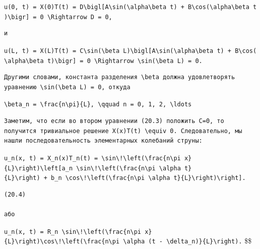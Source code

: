 \documentclass[
  ukrainian,
]{article}
\begin{document}
\texttt{u(0,\ t)\ =\ X(0)T(t)\ =\ D\textbackslash{}bigl{[}A\textbackslash{}sin(\textbackslash{}alpha\textbackslash{}beta\ t)\ +\ B\textbackslash{}cos(\textbackslash{}alpha\textbackslash{}beta\ t)\textbackslash{}bigr{]}\ =\ 0\ \textbackslash{}Rightarrow\ D\ =\ 0,}

\begin{verbatim}
и
\end{verbatim}

\texttt{u(L,\ t)\ =\ X(L)T(t)\ =\ C\textbackslash{}sin(\textbackslash{}beta\ L)\textbackslash{}bigl{[}A\textbackslash{}sin(\textbackslash{}alpha\textbackslash{}beta\ t)\ +\ B\textbackslash{}cos(\textbackslash{}alpha\textbackslash{}beta\ t)\textbackslash{}bigr{]}\ =\ 0\ \textbackslash{}Rightarrow\ \textbackslash{}sin(\textbackslash{}beta\ L)\ =\ 0.}

\begin{verbatim}
Другими словами, константа разделения \beta должна удовлетворять уравнению \sin(\beta L) = 0, откуда
\end{verbatim}

\texttt{\textbackslash{}beta\_n\ =\ \textbackslash{}frac\{n\textbackslash{}pi\}\{L\},\ \textbackslash{}qquad\ n\ =\ 0,\ 1,\ 2,\ \textbackslash{}ldots}

\begin{verbatim}
Заметим, что если во втором уравнении (20.3) положить C=0, то получится тривиальное решение X(x)T(t) \equiv 0. Следовательно, мы нашли последовательность элементарных колебаний струны:
\end{verbatim}

\texttt{u\_n(x,\ t)\ =\ X\_n(x)T\_n(t)\ =\ \textbackslash{}sin\textbackslash{}!\textbackslash{}left(\textbackslash{}frac\{n\textbackslash{}pi\ x\}\{L\}\textbackslash{}right)\textbackslash{}left{[}a\_n\ \textbackslash{}sin\textbackslash{}!\textbackslash{}left(\textbackslash{}frac\{n\textbackslash{}pi\ \textbackslash{}alpha\ t\}\{L\}\textbackslash{}right)\ +\ b\_n\ \textbackslash{}cos\textbackslash{}!\textbackslash{}left(\textbackslash{}frac\{n\textbackslash{}pi\ \textbackslash{}alpha\ t\}\{L\}\textbackslash{}right)\textbackslash{}right{]}.}

\begin{verbatim}
(20.4)

або
\end{verbatim}

\texttt{u\_n(x,\ t)\ =\ R\_n\ \textbackslash{}sin\textbackslash{}!\textbackslash{}left(\textbackslash{}frac\{n\textbackslash{}pi\ x\}\{L\}\textbackslash{}right)\textbackslash{}cos\textbackslash{}!\textbackslash{}left(\textbackslash{}frac\{n\textbackslash{}pi\ \textbackslash{}alpha\ (t\ -\ \textbackslash{}delta\_n)\}\{L\}\textbackslash{}right).}
\$\$
\end{document}
